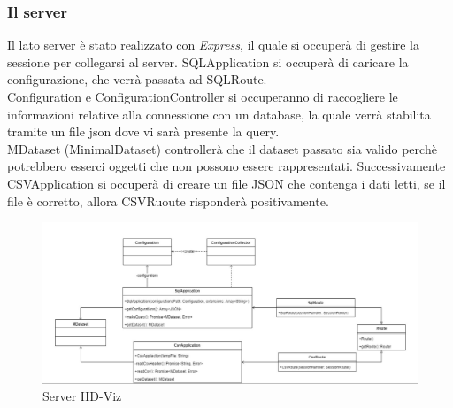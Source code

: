 \documentclass[../manuale_sviluppatore.tex]{subfiles}
\begin{document}
\subsubsection{Il server}

Il lato server è stato realizzato con \emph{Express}, il quale si occuperà di gestire la sessione per collegarsi al server.
SQLApplication si occuperà di caricare la configurazione, che verrà passata ad SQLRoute.\\
Configuration e ConfigurationController si occuperanno di raccogliere le informazioni relative alla connessione con un database, la quale verrà stabilita tramite un file
json dove vi sarà presente la query.\\
MDataset (MinimalDataset) controllerà che il dataset passato sia valido perchè potrebbero esserci oggetti che non possono essere rappresentati. Successivamente
CSVApplication si occuperà di creare un file JSON che contenga i dati letti, se il file è corretto, allora CSVRuoute risponderà positivamente.

\begin{figure}[H]
	\centering
	\includegraphics[width=18cm]{img/server.jpg}
	\caption{Server HD-Viz}
\end{figure}
\end{document}
